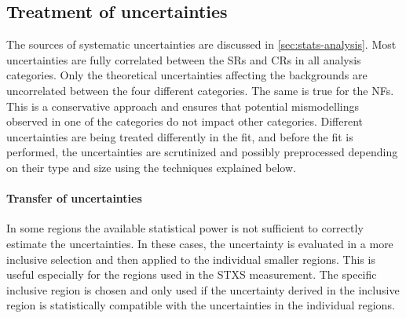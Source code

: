 \subsection{Treatment of uncertainties}
The sources of systematic uncertainties are discussed in \cref{sec:stats-analysis}. 
Most uncertainties are fully correlated between the SRs and CRs in all analysis categories. Only the theoretical uncertainties affecting the backgrounds are uncorrelated between the four different categories. The same is true for the NFs. This is a conservative approach and ensures that potential mismodellings observed in one of the categories do not impact other categories. 
Different uncertainties are being treated differently in the fit, and before the fit is performed, the uncertainties are scrutinized and possibly preprocessed depending on their type and size using the techniques explained below.

\paragraph{Transfer of uncertainties}
In some regions the available statistical power is not sufficient to correctly estimate the uncertainties. 
In these cases, the uncertainty is evaluated in a more inclusive selection and then applied to the individual smaller regions. This is useful especially for the regions used in the STXS measurement. The specific inclusive region is chosen and only used if the uncertainty derived in the inclusive region is statistically compatible with the uncertainties in the individual regions. 

